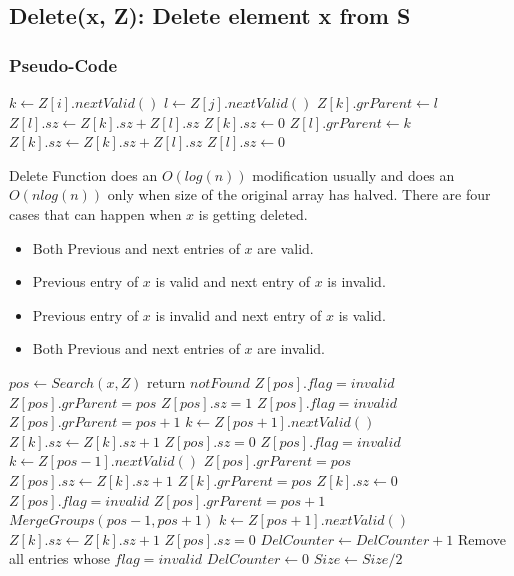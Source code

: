 \documentclass{article}
\begin{document}
\subsection{Delete(x, Z): Delete element x from S}
\subsubsection{Pseudo-Code}
\begin{algorithmic}[1]
  \State $k \gets  Z[i].nextValid()$
  \State $l \gets Z[j].nextValid()$
  \State $Z[k].grParent \gets l$
  \State $Z[l].sz \gets Z[k].sz + Z[l].sz$
  \State $Z[k].sz \gets 0$
  \Else
  \State $Z[l].grParent \gets k$
  \State $Z[k].sz \gets Z[k].sz + Z[l].sz$
  \State $Z[l].sz \gets 0$ 
  \EndIf
  \EndProcedure
\end{algorithmic}
Delete Function does an $O(log(n))$ modification usually and does an $O(nlog(n))$ only when size of the original array has halved. There are four cases that can happen when $x$ is getting deleted. \\
\begin{itemize}
\item Both Previous and next entries of $x$ are valid.
\item Previous entry of $x$ is valid and next entry of $x$ is invalid.
\item Previous entry of $x$ is invalid and next entry of $x$ is valid.
\item Both Previous and next entries of $x$ are invalid.
\end{itemize}
\begin{algorithmic}[1]
  \State $pos \gets Search(x,Z)$
  \State return $notFound$
  \Else
  \State $Z[pos].flag = invalid$
  \State $Z[pos].grParent = pos$
  \State $Z[pos].sz = 1$
  \Else
  \State $Z[pos].flag = invalid$
  \State $Z[pos].grParent = pos+1$
  \State $k \gets Z[pos+1].nextValid()$
  \State $Z[k].sz \gets Z[k].sz + 1$
  \State $Z[pos].sz = 0$
  \EndIf
  \Else
  \State $Z[pos].flag = invalid$
  \State $k \gets Z[pos-1].nextValid()$
  \State $Z[pos].grParent = pos$
  \State $Z[pos].sz \gets Z[k].sz + 1$
  \State $Z[k].grParent = pos$
  \State $Z[k].sz \gets 0$
  \Else
  \State $Z[pos].flag = invalid$
  \State $Z[pos].grParent = pos+1$
  \State $MergeGroups(pos-1,pos+1)$
  \State $k \gets Z[pos+1].nextValid()$
  \State $Z[k].sz \gets Z[k].sz + 1$
  \State $Z[pos].sz = 0$
  \EndIf
  \EndIf
  \State $DelCounter \gets DelCounter +1$
  \Else
  \State Remove all entries whose $flag = invalid$
  \State $DelCounter \gets 0$
  \State $Size \gets Size/2$
  \EndIf
  \EndIf
  \EndProcedure
\end{algorithmic} 
\end{document}

